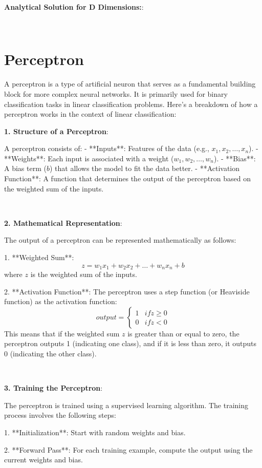\documentclass{article}
\newenvironment{cheatformula}[1][כותרת]{
    \begin{minipage}{\linewidth}
    \textbf{#1}:
}{
    \end{minipage}\\[0ex]
}
\begin{document}
\begin{multicols*}{2}
\begin{cheatformula}[Analytical Solution for D Dimensions:]
\end{cheatformula}

\pagebreak
\section{Perceptron}
A perceptron is a type of artificial neuron that serves as a fundamental building block for more complex neural networks. It is primarily used for binary classification tasks in linear classification problems. Here’s a breakdown of how a perceptron works in the context of linear classification:

\begin{cheatformula}[1. Structure of a Perceptron]
A perceptron consists of:
- **Inputs**: Features of the data (e.g., $x_1, x_2, \ldots, x_n$).
- **Weights**: Each input is associated with a weight ($w_1, w_2, \ldots, w_n$).
- **Bias**: A bias term ($b$) that allows the model to fit the data better.
- **Activation Function**: A function that determines the output of the perceptron based on the weighted sum of the inputs.
\end{cheatformula}

\begin{cheatformula}[2. Mathematical Representation]
The output of a perceptron can be represented mathematically as follows:

1. **Weighted Sum**:
   $$
   z = w_1x_1 + w_2x_2 + \ldots + w_nx_n + b
   $$
   where $z$ is the weighted sum of the inputs.

2. **Activation Function**:
   The perceptron uses a step function (or Heaviside function) as the activation function:
   $$
   output = 
   \begin{cases} 
   1 & if  z \geq 0 \\
   0 & if  z < 0 
   \end{cases}
   $$
   This means that if the weighted sum $z$ is greater than or equal to zero, the perceptron outputs 1 (indicating one class), and if it is less than zero, it outputs 0 (indicating the other class).
\end{cheatformula}


\begin{cheatformula}[3. Training the Perceptron]
The perceptron is trained using a supervised learning algorithm. The training process involves the following steps:

1. **Initialization**: Start with random weights and bias.

2. **Forward Pass**: For each training example, compute the output using the current weights and bias.


\end{cheatformula}
\end{multicols*}
\end{document}
